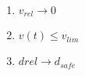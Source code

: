 \documentclass{article}
\begin{document}
\begin{enumerate}
\item $v_{rel}\rightarrow 0$
\item $v(t)\leq v_{lim}$
\item $d{rel}\rightarrow d_{safe}$

\end{enumerate}
\end{document}
